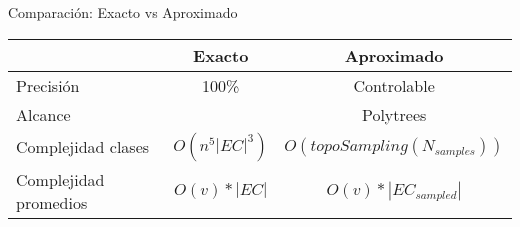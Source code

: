 \begin{frame}{Comparación: Exacto vs Aproximado}
	\centering
	\begin{tabular}{lcc}
		\toprule
		& \textbf{Exacto} & \textbf{Aproximado} \\
		\midrule
		Precisión   & 100\% & Controlable \\
		Alcance     & \dtrees{} & Polytrees \\
		Complejidad clases & $O(n^5|EC|^3)$ &  $O(topoSampling(N_{samples}))$ \\
		Complejidad promedios & $O(v)*|EC|$ & $ O(v)*|EC_{sampled}|$ \\
		\bottomrule
	\end{tabular}
\end{frame}
